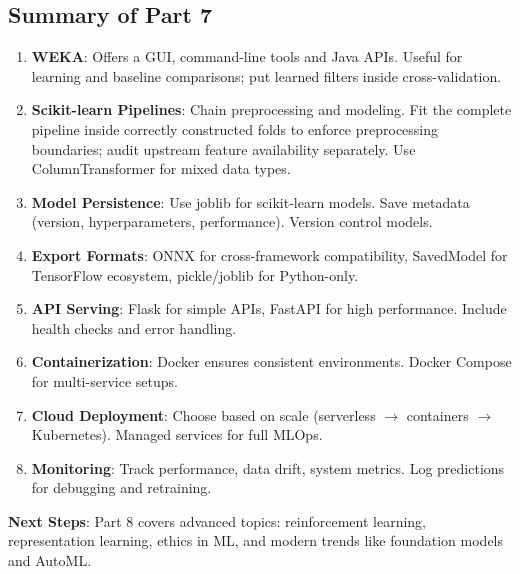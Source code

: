 \documentclass[11pt,twoside]{article}
\numberwithin{equation}{section}
\theoremstyle{plain}
\theoremstyle{definition}
\theoremstyle{remark}
\begin{document}
\subsection{Summary of Part 7}

\begin{tcolorbox}[colback=yellow!10!white,colframe=orange!75!black,title=Key Takeaways]
\begin{enumerate}
\item \textbf{WEKA}: Offers a GUI, command-line tools and Java APIs. Useful for learning and baseline comparisons; put learned filters inside cross-validation.

\item \textbf{Scikit-learn Pipelines}: Chain preprocessing and modeling. Fit the complete pipeline inside correctly constructed folds to enforce preprocessing boundaries; audit upstream feature availability separately. Use ColumnTransformer for mixed data types.

\item \textbf{Model Persistence}: Use joblib for scikit-learn models. Save metadata (version, hyperparameters, performance). Version control models.

\item \textbf{Export Formats}: ONNX for cross-framework compatibility, SavedModel for TensorFlow ecosystem, pickle/joblib for Python-only.

\item \textbf{API Serving}: Flask for simple APIs, FastAPI for high performance. Include health checks and error handling.

\item \textbf{Containerization}: Docker ensures consistent environments. Docker Compose for multi-service setups.

\item \textbf{Cloud Deployment}: Choose based on scale (serverless $\to$ containers $\to$ Kubernetes). Managed services for full MLOps.

\item \textbf{Monitoring}: Track performance, data drift, system metrics. Log predictions for debugging and retraining.
\end{enumerate}

\textbf{Next Steps}: Part 8 covers advanced topics: reinforcement learning, representation learning, ethics in ML, and modern trends like foundation models and AutoML.
\end{tcolorbox}
\end{document}

